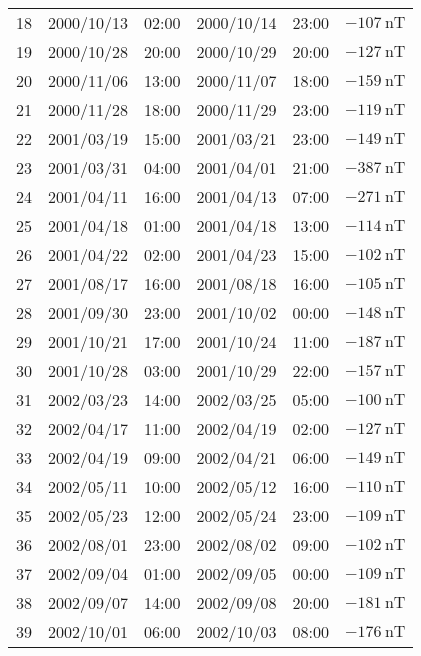 \begin{table}[ht]
\begin{adjustbox}{width=\textwidth,totalheight=0.95\textheight,keepaspectratio}
\begin{tabular}{cccccc}
    18 & 2000/10/13 & 02:00 & 2000/10/14 & 23:00 & $ \SI{-107}{\nano\tesla}$ \\
    19 & 2000/10/28 & 20:00 & 2000/10/29 & 20:00 & $ \SI{-127}{\nano\tesla}$ \\
    20 & 2000/11/06 & 13:00 & 2000/11/07 & 18:00 & $ \SI{-159}{\nano\tesla}$ \\
    21 & 2000/11/28 & 18:00 & 2000/11/29 & 23:00 & $ \SI{-119}{\nano\tesla}$ \\
    22 & 2001/03/19 & 15:00 & 2001/03/21 & 23:00 & $ \SI{-149}{\nano\tesla}$ \\
    23 & 2001/03/31 & 04:00 & 2001/04/01 & 21:00 & $ \SI{-387}{\nano\tesla}$ \\
    24 & 2001/04/11 & 16:00 & 2001/04/13 & 07:00 & $ \SI{-271}{\nano\tesla}$ \\
    25 & 2001/04/18 & 01:00 & 2001/04/18 & 13:00 & $ \SI{-114}{\nano\tesla}$ \\
    26 & 2001/04/22 & 02:00 & 2001/04/23 & 15:00 & $ \SI{-102}{\nano\tesla}$ \\
    27 & 2001/08/17 & 16:00 & 2001/08/18 & 16:00 & $ \SI{-105}{\nano\tesla}$ \\
    28 & 2001/09/30 & 23:00 & 2001/10/02 & 00:00 & $ \SI{-148}{\nano\tesla}$ \\
    29 & 2001/10/21 & 17:00 & 2001/10/24 & 11:00 & $ \SI{-187}{\nano\tesla}$ \\
    30 & 2001/10/28 & 03:00 & 2001/10/29 & 22:00 & $ \SI{-157}{\nano\tesla}$ \\
    31 & 2002/03/23 & 14:00 & 2002/03/25 & 05:00 & $ \SI{-100}{\nano\tesla}$ \\
    32 & 2002/04/17 & 11:00 & 2002/04/19 & 02:00 & $ \SI{-127}{\nano\tesla}$ \\
    33 & 2002/04/19 & 09:00 & 2002/04/21 & 06:00 & $ \SI{-149}{\nano\tesla}$ \\
    34 & 2002/05/11 & 10:00 & 2002/05/12 & 16:00 & $ \SI{-110}{\nano\tesla}$ \\
    35 & 2002/05/23 & 12:00 & 2002/05/24 & 23:00 & $ \SI{-109}{\nano\tesla}$ \\
    36 & 2002/08/01 & 23:00 & 2002/08/02 & 09:00 & $ \SI{-102}{\nano\tesla}$ \\
    37 & 2002/09/04 & 01:00 & 2002/09/05 & 00:00 & $ \SI{-109}{\nano\tesla}$ \\
    38 & 2002/09/07 & 14:00 & 2002/09/08 & 20:00 & $ \SI{-181}{\nano\tesla}$ \\
    39 & 2002/10/01 & 06:00 & 2002/10/03 & 08:00 & $ \SI{-176}{\nano\tesla}$ \\

\end{tabular}
\end{adjustbox}
\end{table}
